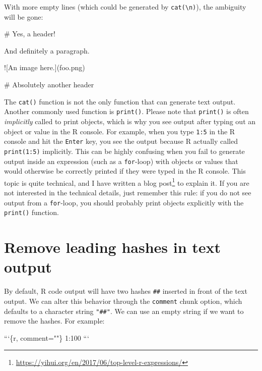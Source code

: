 \documentclass[
  11pt,
]{krantz}
\newenvironment{Shaded}{\begin{snugshade}}{\end{snugshade}}
\newcommand{\AlertTok}[1]{\textcolor[rgb]{0.33,0.33,0.33}{#1}}
\newcommand{\BaseNTok}[1]{\textcolor[rgb]{0.06,0.06,0.06}{#1}}
\newcommand{\FunctionTok}[1]{\textcolor[rgb]{0,0,0}{#1}}
\newcommand{\NormalTok}[1]{#1}
\renewcommand{\href}[2]{#2\footnote{\url{#1}}}
\begin{document}
With more empty lines (which could be generated by \texttt{cat(\textquotesingle{}\textbackslash{}n\textquotesingle{})}), the ambiguity will be gone:

\begin{Shaded}
\begin{Highlighting}[]
\FunctionTok{# Yes, a header!}

\NormalTok{And definitely a paragraph.}

\AlertTok{![An image here.](foo.png)}

\FunctionTok{# Absolutely another header}
\end{Highlighting}
\end{Shaded}

The \texttt{cat()} function is not the only function that can generate text output. Another commonly used function is \texttt{print()}. Please note that \texttt{print()} is often \emph{implicitly} called to print objects, which is why you see output after typing out an object or value in the R console. For example, when you type \texttt{1:5} in the R console and hit the \texttt{Enter} key, you see the output because R actually called \texttt{print(1:5)} implicitly. This can be highly confusing when you fail to generate output inside an expression (such as a \texttt{for}-loop) with objects or values that would otherwise be correctly printed if they were typed in the R console. This topic is quite technical, and I have written \href{https://yihui.org/en/2017/06/top-level-r-expressions/}{a blog post} to explain it. If you are not interested in the technical details, just remember this rule: if you do not see output from a \texttt{for}-loop, you should probably print objects explicitly with the \texttt{print()} function.

\hypertarget{opts-comment}{%
\section{Remove leading hashes in text output}\label{opts-comment}}

By default, R code output will have two hashes \texttt{\#\#} inserted in front of the text output. We can alter this behavior through the \texttt{comment} chunk option, which defaults to a character string \texttt{"\#\#"}. We can use an empty string if we want to remove the hashes. For example:

\begin{Shaded}
\begin{Highlighting}[]
\BaseNTok{```\{r, comment=""\}}
\BaseNTok{1:100}
\BaseNTok{```}
\end{Highlighting}
\end{Shaded}
\end{document}

